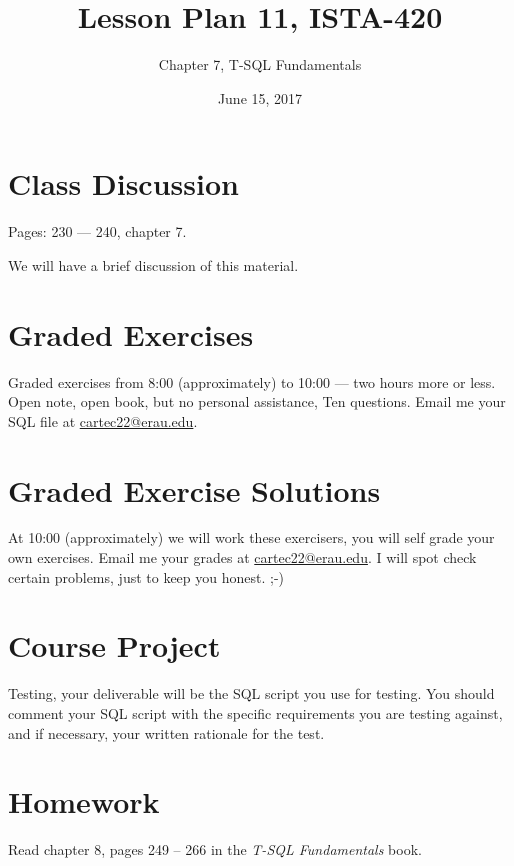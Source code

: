 \documentclass{article}
\title{Lesson Plan 11, ISTA-420}
\author{Chapter 7, T-SQL Fundamentals}
\date{June 15, 2017}
\begin{document}
    

    \maketitle{}

    \section{Class Discussion}

    Pages: 230 --- 240, chapter 7.

    We will have a brief discussion of this material.

    \section{Graded Exercises}

    Graded exercises from 8:00 (approximately) to 10:00 --- two hours more or less. Open note, open book, but no personal assistance, Ten questions. Email me your SQL file at \url{cartec22@erau.edu}.

    \section{Graded Exercise Solutions}

    At 10:00 (approximately) we will work these exercisers, you will self grade your own exercises.  Email me your grades at \url{cartec22@erau.edu}. I will spot check certain problems, just to keep you honest. ;-)


    \section{Course Project}

    
    Testing, your deliverable will be the SQL script you use for testing. You should comment your SQL script with the specific requirements you are testing against, and if necessary, your written rationale for the test. 

    \section{Homework}



        Read chapter 8, pages 249  -- 266  in the \textit{T-SQL Fundamentals} book.
        
\end{document}
